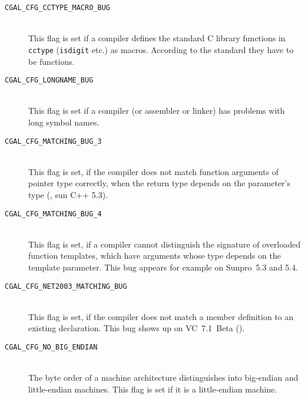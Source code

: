 \begin{description}
\item[{\tt CGAL\_CFG\_CCTYPE\_MACRO\_BUG}]~\\
 This flag is set if a compiler defines the standard C library
 functions in {\tt cctype} ({\tt isdigit} etc.) as macros.  According
 to the standard they have to be functions.
 
\item[{\tt CGAL\_CFG\_LONGNAME\_BUG}]~\\
 This flag is set if a compiler (or assembler or linker) has problems 
 with long symbol names. 

\item[{\tt CGAL\_CFG\_MATCHING\_BUG\_3}]~\\
 This flag is set, if the compiler does not match function arguments
 of pointer type correctly, when the return type depends on the
 parameter's type (\eg, sun C++ 5.3).

\item[{\tt CGAL\_CFG\_MATCHING\_BUG\_4}]~\\
 This flag is set, if a compiler cannot distinguish the signature of
 overloaded function templates, which have arguments whose type
 depends on the template parameter.  This bug appears for example on
 Sunpro~5.3 and 5.4.

\item[{\tt CGAL\_CFG\_NET2003\_MATCHING\_BUG}]~\\
 This flag is set, if the compiler does not match a member definition
 to an existing declaration. This bug shows up on VC~7.1~Beta
 ().

\item[{\tt CGAL\_CFG\_NO\_BIG\_ENDIAN}]~\\
  The byte order of a machine architecture distinguishes into
  big-endian and little-endian machines.  This flag is
  set if it is a little-endian machine.
 

\end{description}
